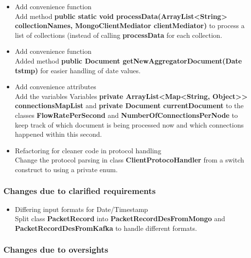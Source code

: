 \documentclass[oneside, english, final]{design}
\begin{document}
\begin{itemize}
  \item{Add convenience function}
        \\
        Add method \textsf{\textbf{public static void processData(ArrayList<String> collectionNames, MongoClientMediator clientMediator)}} to process a list of collections (instead of calling \textsf{\textbf{processData}} for each collection.

  \item{Add convenience function}
        \\
        Added method \textsf{\textbf{public Document getNewAggregatorDocument(Date tstmp)}} for easier handling of date values.


  \item{Add convenience attributes}
        \\
        Add the variables Variables
        \textsf{\textbf{private ArrayList<Map<String, Object>> connectionsMapList}} and
        \textsf{\textbf{private Document currentDocument}} to the classes \textsf{\textbf{FlowRatePerSecond}} and \textsf{\textbf{NumberOfConnectionsPerNode}} to
        keep track of which document is being processed now and which connections happened within this second.


  \item{Refactoring for cleaner code in protocol handling}
        \\
        Change the protocol parsing in class \textsf{\textbf{ClientProtocoHandler}} from a switch construct to using a private enum.

\end{itemize}

\subsubsection{Changes due to clarified requirements}
\begin{itemize}
  \item{Differing input formats for Date/Timestamp}
        \\
        Split class \textsf{\textbf{PacketRecord}} into \textsf{\textbf{PacketRecordDesFromMongo}} and \textsf{\textbf{PacketRecordDesFromKafka}} to handle different formats.

\end{itemize}


\subsubsection{Changes due to oversights}
\end{document}
